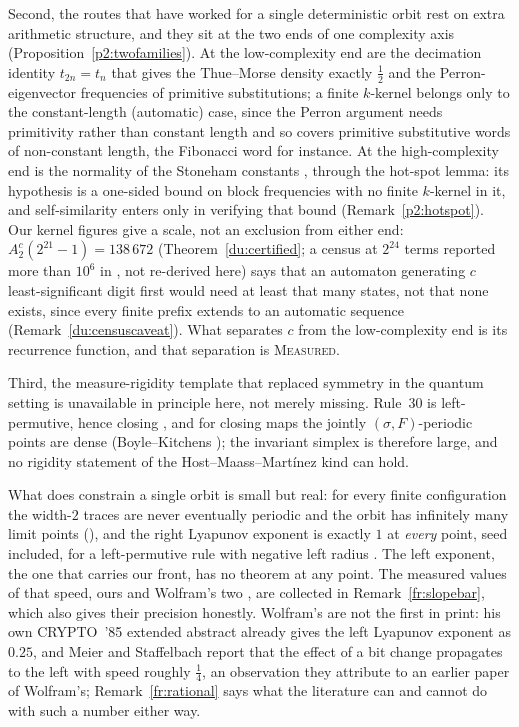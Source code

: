 \documentclass[11pt]{article}
\theoremstyle{definition}
\theoremstyle{remark}
\newcommand{\MEASURED}{\textsc{Measured}}
\begin{document}
Second, the routes that have worked for a single deterministic orbit rest on extra arithmetic
structure, and they sit at the two ends of one complexity axis (Proposition~\ref{p2:twofamilies}). At the
low-complexity end are the decimation identity $t_{2n}=t_n$ that gives the Thue--Morse density exactly
$\tfrac12$ and the Perron-eigenvector frequencies of primitive substitutions; a finite $k$-kernel belongs
only to the constant-length (automatic) case, since the Perron argument needs primitivity rather than
constant length and so covers primitive substitutive words of non-constant length, the Fibonacci word
for instance. At the high-complexity end is the normality of the Stoneham constants \cite{BM}, through
the hot-spot lemma: its hypothesis is a one-sided bound on block frequencies with no finite $k$-kernel
in it, and self-similarity enters only in verifying that bound (Remark~\ref{p2:hotspot}). Our kernel
figures give a scale, not an exclusion from either end: $A^c_2(2^{21}-1)=138\,672$
(Theorem~\ref{du:certified}; a census at $2^{24}$ terms reported more than $10^{6}$ in \cite{Auto}, not
re-derived here) says that an automaton generating $c$ least-significant digit first would need at
least that many states, not that none exists, since every finite prefix extends to an automatic
sequence (Remark~\ref{du:censuscaveat}). What separates $c$ from the low-complexity end is its
recurrence function, and that separation is \MEASURED.

Third, the measure-rigidity template that replaced symmetry in the quantum setting is unavailable in
principle here, not merely missing. Rule~30 is left-permutive, hence closing \cite[\S3]{Kurka}, and for closing maps the
jointly $(\sigma,F)$-periodic points are dense (Boyle--Kitchens \cite[Thm.~4.4]{BK}); the invariant
simplex is therefore large, and no rigidity statement of the Host--Maass--Mart\'inez kind can hold.

What does constrain a single orbit is small but real: for every finite configuration the width-$2$
traces are never eventually periodic and the orbit has infinitely many limit points
(\cite[Thms.~3.5, 4.7]{Kopra}), and the right Lyapunov exponent is exactly $1$ at \emph{every} point,
seed included, for a left-permutive rule with negative left radius \cite{Kurka}. The left exponent, the
one that carries our front, has no theorem at any point. The measured values of that speed, ours and
Wolfram's two \cite{NKS}, are collected in Remark~\ref{fr:slopebar}, which also gives their precision honestly.
Wolfram's are not the first in print: his own CRYPTO~'85 extended abstract \cite{W85} already gives the left Lyapunov exponent as $0.25$, and Meier and Staffelbach \cite{MS} report that the effect of a
bit change propagates to the left with speed roughly $\tfrac14$, an observation they attribute to an
earlier paper of Wolfram's;
Remark~\ref{fr:rational} says what the literature can and cannot do with such a number either way.
\end{document}
